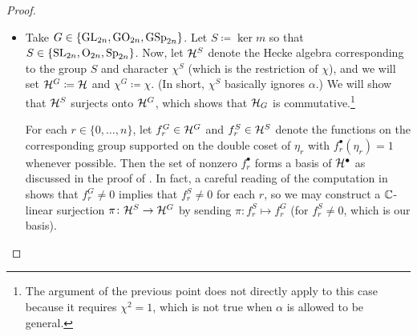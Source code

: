 \begin{proof}
\begin{itemize}
\[\begin{bmatrix}
            1_{n-r} \\ & \varepsilon1_{r} \\ && 1_{n-r} \\ &&& \varepsilon1_{r}
        \end{bmatrix}\right)f(\eta_r).\]
        If $\chi=1$, then the extra factor here goes away, so we are safe. Otherwise, $\chi\ne1$. Continuing, if $G=\O_{2n}$, then $\varepsilon=1$, so the extra factor here still goes away. Otherwise, $\varepsilon=-1$. If $G=\Sp_{2n}$ with $\chi\ne1$, then the proof of  tells us that we only have to pay attention to the case where $r$ is even, and here the Siegel determinant of the matrix in question is $1$, so we are okay. Lastly, we have dealt with the case where $G=\SL_{2n}$ and $\chi\ne1$ in the previous point.

        \item Take $G\in\{\mathrm{GL}_{2n},\mathrm{GO}_{2n},\mathrm{GSp}_{2n}\}$. Let $S\coloneqq\ker m$ so that $S\in\{\mathrm{SL}_{2n},\mathrm{O}_{2n},\mathrm{Sp}_{2n}\}$. Now, let $\mathcal{H}^S$ denote the Hecke algebra corresponding to the group $S$ and character $\chi^S$ (which is the restriction of $\chi$), and we will set $\mathcal{H}^G\coloneqq\mathcal{H}$ and $\chi^G\coloneqq\chi$. (In short, $\chi^S$ basically ignores $\alpha$.) We will show that $\mathcal{H}^S$ surjects onto $\mathcal{H}^G$, which shows that $\mathcal{H}_G$ is commutative.\footnote{The argument of the previous point does not directly apply to this case because it requires $\chi^2=1$, which is not true when $\alpha$ is allowed to be general.}
        
        For each $r\in\{0,\ldots,n\}$, let $f_r^G\in\mathcal{H}^G$ and $f_r^S\in\mathcal{H}^S$ denote the functions on the corresponding group supported on the double coset of $\eta_r$ with $f_r^\bullet(\eta_r)=1$ whenever possible. Then the set of nonzero $f_r^\bullet$ forms a basis of $\mathcal{H}^\bullet$ as discussed in the proof of . In fact, a careful reading of the computation in  shows that $f_r^G\ne0$ implies that $f_r^S\ne0$ for each $r$, so we may construct a $\mathbb C$-linear surjection $\pi\colon\mathcal{H}^S\to\mathcal{H}^G$ by sending $\pi\colon f_r^S\mapsto f_r^G$ (for $f_r^S\ne0$, which is our basis).


\end{itemize}
\end{proof}
